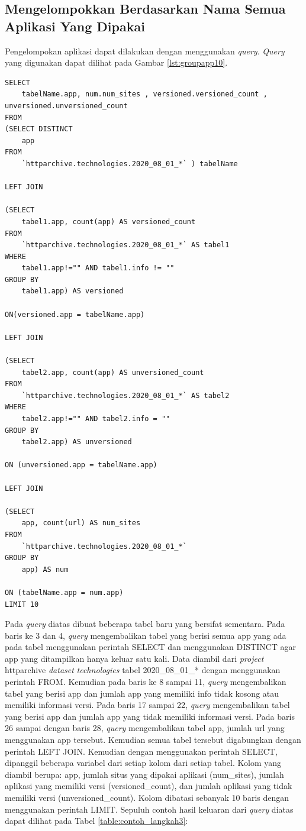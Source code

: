 \subsection{Mengelompokkan Berdasarkan Nama Semua Aplikasi Yang Dipakai}
Pengelompokan aplikasi dapat dilakukan dengan menggunakan \textit{query}. \textit{Query} yang digunakan dapat dilihat pada Gambar \ref{lst:groupapp10}.
\begin{lstlisting}[caption={Mengelompokan Semua Aplikasi yang Dipakai}, label={lst:groupapp10}]
SELECT 
	tabelName.app, num.num_sites , versioned.versioned_count , unversioned.unversioned_count
FROM 
(SELECT DISTINCT 
	app
FROM 
	`httparchive.technologies.2020_08_01_*` ) tabelName

LEFT JOIN 

(SELECT 
	tabel1.app, count(app) AS versioned_count
FROM 
	`httparchive.technologies.2020_08_01_*` AS tabel1
WHERE 
	tabel1.app!="" AND tabel1.info != "" 
GROUP BY 
	tabel1.app) AS versioned

ON(versioned.app = tabelName.app)

LEFT JOIN

(SELECT 
	tabel2.app, count(app) AS unversioned_count
FROM 
	`httparchive.technologies.2020_08_01_*` AS tabel2
WHERE 
	tabel2.app!="" AND tabel2.info = "" 
GROUP BY 
	tabel2.app) AS unversioned

ON (unversioned.app = tabelName.app)

LEFT JOIN 

(SELECT 
	app, count(url) AS num_sites
FROM 
	`httparchive.technologies.2020_08_01_*`
GROUP BY 
	app) AS num

ON (tabelName.app = num.app)
LIMIT 10
\end{lstlisting}

Pada \textit{query} diatas dibuat beberapa tabel baru yang bersifat sementara. Pada baris ke 3 dan 4, \textit{query} mengembalikan tabel yang berisi semua app yang ada pada tabel menggunakan perintah SELECT dan menggunakan DISTINCT agar app yang ditampilkan hanya keluar satu kali. Data diambil dari \textit{project} httparchive \textit{dataset} \textit{technologies} tabel 2020\_08\_01\_* dengan menggunakan perintah FROM. Kemudian pada baris ke 8 sampai 11, \textit{query} mengembalikan tabel yang berisi app dan jumlah app yang memiliki info tidak kosong atau memiliki informasi versi. Pada baris 17 sampai 22, \textit{query} mengembalikan tabel yang berisi app dan jumlah app yang tidak memiliki informasi versi. Pada baris 26 sampai dengan baris 28, \textit{query} mengembalikan tabel app, jumlah url yang menggunakan app tersebut. Kemudian semua tabel tersebut digabungkan dengan perintah LEFT JOIN. Kemudian dengan menggunakan perintah SELECT, dipanggil beberapa variabel dari setiap kolom dari setiap tabel. Kolom yang diambil berupa: app, jumlah situs yang dipakai aplikasi (num\_sites), jumlah aplikasi yang memiliki versi (versioned\_count), dan jumlah aplikasi yang tidak memiliki versi (unversioned\_count). Kolom dibatasi sebanyak 10 baris dengan menggunakan perintah LIMIT. Sepuluh contoh hasil keluaran dari \textit{query} diatas dapat dilihat pada Tabel \ref{table:contoh_langkah3}:

